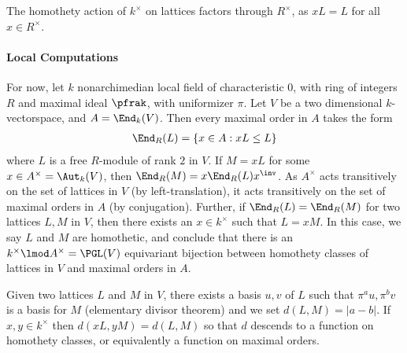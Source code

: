 \documentclass[draft]{article}
\begin{document}
\begin{remark}
    \begin{enumerate*}
        \item
    \end{enumerate*}
     The homothety action of $k^\times$ on lattices factors through $R^\times$, as $xL = L$ for all $x\in R^\times$. 
\end{remark}
 


\paragraph*{Local Computations} 
For now, let $k$ nonarchimedian local field of characteristic $0$, with ring of integers $R$ and maximal ideal $\pfrak$, with uniformizer $\pi$. Let $V$ be a two dimensional $k$-vectorspace, and $A = \End_k(V)$. Then every maximal order in $A$ takes the form 
\begin{align*}
    \End_R(L) = \{ x \in A : xL\leq L\}
\end{align*}
where $L$ is a free $R$-module of rank $2$ in $V$. If $M = xL$ for some $x\in A^\times = \Aut_k(V)$, then $\End_R(M) = x\End_R(L)x^\inv$. As $A^\times$ acts transitively on the set of lattices in $V$ (by left-translation), it acts transitively on the set of maximal orders in $A$ (by conjugation). Further, if $\End_R(L)=\End_R(M)$ for two lattices $L,M$ in $V$, then there exists an $x \in k^\times$ such that $L = x M$. In this case, we say $L$ and $M$ are homothetic, and conclude that there is an $k^\times \lmod A^\times = \PGL(V)$ equivariant bijection between homothety classes of lattices in $V$ and maximal orders in $A$. 

Given two lattices $L$ and $M$ in $V$, there exists a basis $u,v$ of $L$ such that $\pi^a u , \pi^b v$ is a basis for $M$ (elementary divisor theorem) and we set $d(L,M) = |a-b|$. If $x,y\in k^\times$ then $d(xL,yM)=d(L,M)$ so that $d$ descends to a function on homothety classes, or equivalently a function on maximal orders. 


\cite{sallyFourierTransformOrbital1983}


\end{document}

